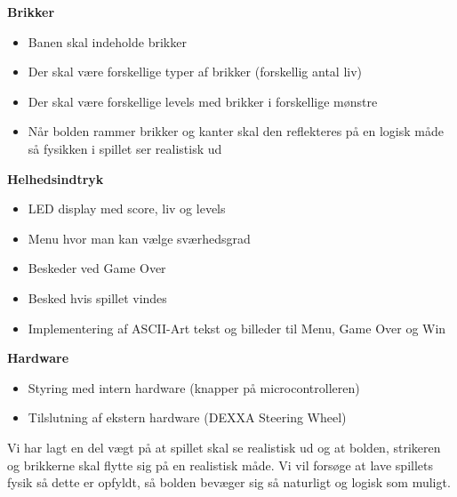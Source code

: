 \textbf{Brikker}
\begin{itemize}
\item Banen skal indeholde brikker
\item Der skal være forskellige typer af brikker (forskellig antal liv)
\item Der skal være forskellige levels med brikker i forskellige mønstre
\item Når bolden rammer brikker og kanter skal den reflekteres på en logisk måde så fysikken i spillet ser realistisk ud
\end{itemize}

\textbf{Helhedsindtryk}
\begin{itemize}
\item LED display med score, liv og levels
\item Menu hvor man kan vælge sværhedsgrad
\item Beskeder ved Game Over
\item Besked hvis spillet vindes
\item Implementering af ASCII-Art tekst og billeder til Menu, Game Over og Win
\end{itemize}

\textbf{Hardware}
\begin{itemize}
\item Styring med intern hardware (knapper på microcontrolleren)
\item Tilslutning af ekstern hardware (DEXXA Steering Wheel)
\end{itemize}

Vi har lagt en del vægt på at spillet skal se realistisk ud og at bolden, strikeren og brikkerne skal flytte sig på en realistisk måde. Vi vil forsøge at lave spillets fysik så dette er opfyldt, så bolden bevæger sig så naturligt og logisk som muligt. 

\newpage